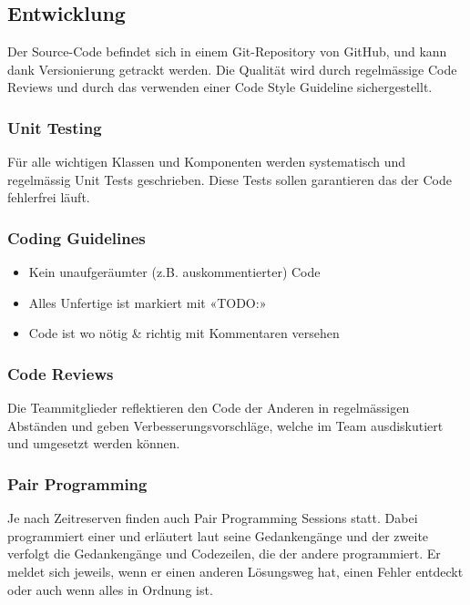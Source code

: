 \subsection{Entwicklung}
Der Source-Code befindet sich in einem Git-Repository von GitHub, und kann dank Versionierung getrackt werden. Die Qualität wird durch regelmässige Code Reviews und durch das verwenden einer Code Style
Guideline sichergestellt.

\subsubsection{Unit Testing}
Für alle wichtigen Klassen und Komponenten werden systematisch und regelmässig Unit Tests geschrieben. Diese Tests sollen garantieren das der Code fehlerfrei läuft.

\subsubsection{Coding Guidelines}
\begin{itemize}
    \item Kein unaufgeräumter (z.B. auskommentierter) Code
    \item Alles Unfertige ist markiert mit «TODO:»
    \item Code ist wo nötig \& richtig mit Kommentaren versehen
\end{itemize}

\subsubsection{Code Reviews}
Die Teammitglieder reflektieren den Code der Anderen in regelmässigen Abständen und geben Verbesserungsvorschläge, welche im Team ausdiskutiert und umgesetzt werden können.

\subsubsection{Pair Programming}
Je nach Zeitreserven finden auch Pair Programming Sessions statt. Dabei programmiert einer und erläutert laut seine Gedankengänge und der zweite verfolgt die Gedankengänge und Codezeilen, die der andere programmiert. Er meldet sich jeweils, wenn er einen anderen Lösungsweg hat, einen Fehler   entdeckt oder auch wenn alles in Ordnung ist.